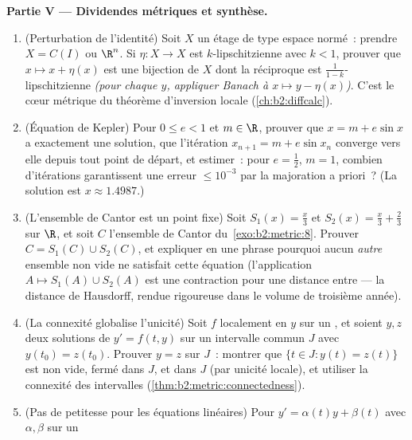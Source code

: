\begin{problem}
\medskip
\noindent\textbf{Partie V --- Dividendes métriques et synthèse.}
\begin{enumerate}[resume]
  \item (Perturbation de l'identité) Soit $X$ un étage  de
        type espace normé~: prendre $X = C(I)$ ou $\R^n$. Si $\eta
        \colon X \to X$ est $k$-lipschitzienne avec $k < 1$, prouver
        que $x \mapsto x + \eta(x)$ est une bijection de $X$ dont la
        réciproque est $\frac1{1-k}$-lipschitzienne \emph{(pour
        chaque $y$, appliquer Banach à $x \mapsto y - \eta(x)$)}.
        C'est le cœur métrique du théorème d'inversion locale
        (\cref{ch:b2:diffcalc}).
  \item (Équation de Kepler) Pour $0 \leq e < 1$ et $m \in \R$,
        prouver que $x = m + e\sin x$ a exactement une solution, que
        l'itération $x_{n+1} = m + e\sin x_n$ converge vers elle
        depuis tout point de départ, et estimer~: pour $e =
        \frac12$, $m = 1$, combien d'itérations garantissent une
        erreur $\leq 10^{-3}$ par la majoration a priori~? (La
        solution est $x \approx 1.4987$.)
  \item (L'ensemble de Cantor est un point fixe) Soit $S_1(x) =
        \frac x3$ et $S_2(x) = \frac x3 + \frac23$ sur $\R$, et soit
        $C$ l'ensemble de Cantor du~\cref{exo:b2:metric:8}. Prouver
        $C = S_1(C) \cup S_2(C)$, et expliquer en une phrase
        pourquoi aucun \emph{autre} ensemble  non vide ne
        satisfait cette équation (l'application $A \mapsto S_1(A)
        \cup S_2(A)$ est une contraction pour une distance entre
         --- la distance de Hausdorff, rendue rigoureuse
        dans le volume de troisième année).
  \item (La connexité globalise l'unicité) Soit $f$ localement
         en $y$ sur un , et soient $y, z$ deux
        solutions de $y' = f(t, y)$ sur un intervalle commun $J$
        avec $y(t_0) = z(t_0)$. Prouver $y = z$ sur $J$~: montrer que
        $\{t \in J : y(t) = z(t)\}$ est non vide, fermé dans $J$, et
         dans $J$ (par unicité locale), et utiliser la
        connexité des intervalles
        (\cref{thm:b2:metric:connectedness}).
  \item (Pas de petitesse pour les équations linéaires) Pour $y' =
        \alpha(t)y + \beta(t)$ avec $\alpha, \beta$  sur un

\end{enumerate}
\end{problem}
